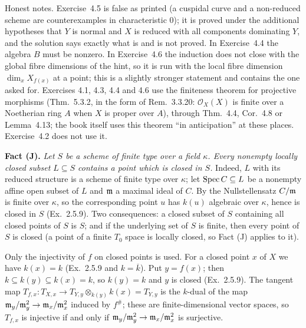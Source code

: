 \documentclass[11pt]{article}
\begin{document}
Honest notes. Exercise~4.5 is false as printed (a cuspidal curve and a non-reduced scheme are counterexamples in characteristic $0$); it is proved under the additional hypotheses that $Y$ is normal and $X$ is reduced with all components dominating $Y$, and the solution says exactly what is and is not proved. In Exercise~4.4 the algebra $B$ must be nonzero. In Exercise~4.6 the induction does not close with the global fibre dimensions of the hint, so it is run with the local fibre dimension $\dim_x X_{f(x)}$ at a point; this is a slightly stronger statement and contains the one asked for. Exercises 4.1, 4.3, 4.4 and 4.6 use the finiteness theorem for projective morphisms (Thm.~5.3.2, in the form of Rem.~3.3.20: $\mathcal O_X(X)$ is finite over a Noetherian ring $A$ when $X$ is proper over $A$), through Thm.~4.4, Cor.~4.8 or Lemma~4.13; the book itself uses this theorem ``in anticipation'' at these places. Exercise~4.2 does not use it.

\medskip
\noindent\textbf{Fact (J).} \emph{Let $S$ be a scheme of finite type over a field $\kappa$. Every nonempty locally closed subset $L\subseteq S$ contains a point which is closed in $S$.} Indeed, $L$ with its reduced structure is a scheme of finite type over $\kappa$; let $\operatorname{Spec} C\subseteq L$ be a nonempty affine open subset of $L$ and $\mathfrak m$ a maximal ideal of $C$. By the Nullstellensatz $C/\mathfrak m$ is finite over $\kappa$, so the corresponding point $u$ has $k(u)$ algebraic over $\kappa$, hence is closed in $S$ (Ex.~2.5.9). Two consequences: a closed subset of $S$ containing all closed points of $S$ is $S$; and if the underlying set of $S$ is finite, then every point of $S$ is closed (a point of a finite $T_0$ space is locally closed, so Fact (J) applies to it).

\pf
Only the injectivity of $f$ on closed points is used. For a closed point $x$ of $X$ we have $k(x)=k$ (Ex.~2.5.9 and $k=\overline k$). Put $y=f(x)$; then $k\subseteq k(y)\subseteq k(x)=k$, so $k(y)=k$ and $y$ is closed (Ex.~2.5.9). The tangent map $T_{f,x}:T_{X,x}\to T_{Y,y}\otimes_{k(y)}k(x)=T_{Y,y}$ is the $k$-dual of the map $\mathfrak m_y/\mathfrak m_y^2\to\mathfrak m_x/\mathfrak m_x^2$ induced by $f^\#$; these are finite-dimensional vector spaces, so $T_{f,x}$ is injective if and only if $\mathfrak m_y/\mathfrak m_y^2\to\mathfrak m_x/\mathfrak m_x^2$ is surjective.
\end{document}

